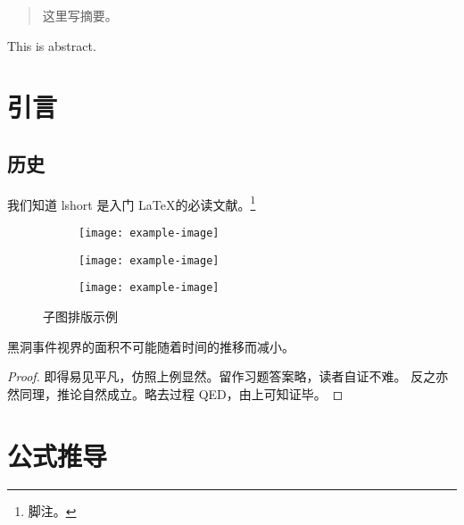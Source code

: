 \documentclass[academic,ncu,newenv]{ncuthesis}
\begin{document}
\maketitle
\frontmatter
\makedecaut
\begin{abstract}
这里写摘要。
\end{abstract}
\begin{abstract*}
This is abstract.
\end{abstract*}
\tableofcontents
\mainmatter
\chapter{引言}
\section{历史}
我们知道 lshort\cite{lshortcn} 是入门 \LaTeX 的必读文献。\footnote{脚注。}
\begin{figure}[htb]
\centering
\begin{subfigure}{.45\textwidth}
\centering
\texttt{[image: example-image]}
\label{fig:subfigexp-a}
\end{subfigure}
\begin{subfigure}{.45\textwidth}
\centering
\texttt{[image: example-image]}
\label{fig:subfigexp-b}
\end{subfigure}
\begin{subfigure}{.45\textwidth}
\centering
\texttt{[image: example-image]}
\label{fig:subfigexp-c}
\end{subfigure}
\caption{子图排版示例}
\label{fig:subfig}
\end{figure}
\begin{law}[黑洞面积定律]
黑洞事件视界的面积不可能随着时间的推移而减小。
\end{law}
\begin{proof}
即得易见平凡，仿照上例显然。留作习题答案略，读者自证不难。
反之亦然同理，推论自然成立。略去过程 QED，由上可知证毕。
\end{proof}
\appendix
\chapter{公式推导}
\end{document}
